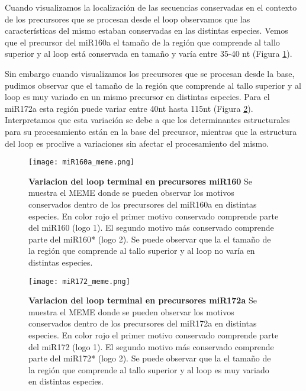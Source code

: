Cuando visualizamos la localización de las secuencias conservadas en el contexto de los precursores que se procesan desde el loop observamos que las características del mismo estaban conservadas en las distintas especies.
Vemos que el precursor del miR160a el tamaño de la región que comprende al tallo superior y al loop está conservada en tamaño y varía entre 35-40 nt (Figura \ref{fig:miR160a_meme}).

Sin embargo cuando visualizamos los precursores que se procesan desde la base, pudimos observar que el tamaño de la región que comprende al tallo superior y al loop es muy variado en un mismo precursor en distintas especies.
Para el miR172a esta región puede variar entre 40nt hasta 115nt (Figura \ref{fig:miR172_meme}). 
Interpretamos que esta variación se debe a que los determinantes estructurales para su procesamiento están en la base del precursor, mientras que la estructura del loop es proclive a variaciones sin afectar el procesamiento del mismo.


\begin{landscape}
    \begin{figure}[htbp!] 
        \centering    
        \texttt{[image: miR160a\_meme.png]}
        \caption[Variacion del loop terminal en precursores miR160]{
			\textbf{Variacion del loop terminal en precursores miR160}
        Se muestra el MEME donde se pueden observar los motivos conservados dentro de los precursores del miR160a en distintas especies.
        En color rojo el primer motivo conservado comprende parte del miR160 (logo 1).
        El segundo motivo más conservado comprende parte del miR160* (logo 2).
        Se puede observar que la el tamaño de la región que comprende al tallo superior y al loop no varía en distintas especies.
        }
        \label{fig:miR160a_meme}
    \end{figure}
\end{landscape}

\begin{landscape}
    \begin{figure}[htbp!] 
        \centering    
        \texttt{[image: miR172\_meme.png]}
        \caption[Variacion del loop terminal en precursores miR172a]{
			\textbf{Variacion del loop terminal en precursores miR172a}
        Se muestra el MEME donde se pueden observar los motivos conservados dentro de los precursores del miR172a en distintas especies.
        En color rojo el primer motivo conservado comprende parte del miR172 (logo 1).
        El segundo motivo más conservado comprende parte del miR172* (logo 2).
        Se puede observar que la el tamaño de la región que comprende al tallo superior y al loop es muy variado en distintas especies.
        }
        \label{fig:miR172_meme}
    \end{figure}
\end{landscape}


